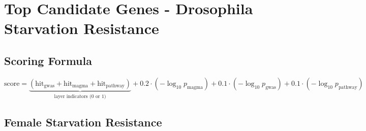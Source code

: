 \documentclass[11pt]{article}
\begin{document}
\section*{Top Candidate Genes - Drosophila Starvation Resistance}

\subsection*{Scoring Formula}

\begin{equation}
\text{score} = \underbrace{(\text{hit}_{\text{gwas}} + \text{hit}_{\text{magma}} + \text{hit}_{\text{pathway}})}_{\text{layer indicators (0 or 1)}} + 0.2 \cdot (-\log_{10} p_{\text{magma}}) + 0.1 \cdot (-\log_{10} p_{\text{gwas}}) + 0.1 \cdot (-\log_{10} p_{\text{pathway}})
\end{equation}

\vspace{0.5cm}


\subsection*{Female Starvation Resistance}
\end{document}
